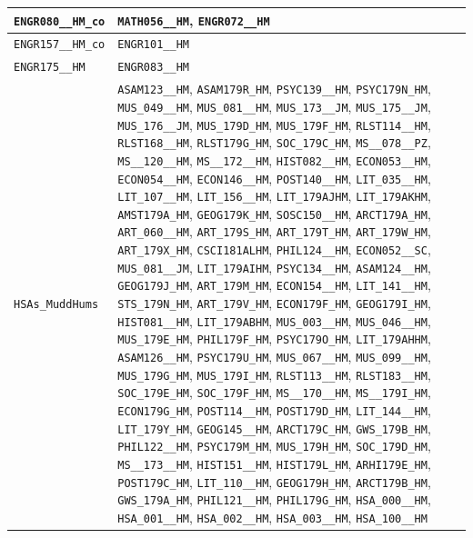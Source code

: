 \begin{longtable}{|p{4.4in}|p{4.4in}|}
    \verb|ENGR080__HM_co| & \verb|MATH056__HM|, \verb|ENGR072__HM|\\\hline
    \verb|ENGR157__HM_co| & \verb|ENGR101__HM|\\\hline
    \verb|ENGR175__HM| & \verb|ENGR083__HM|\\\hline
    \verb|HSAs_MuddHums| & \verb|ASAM123__HM|, \verb|ASAM179R_HM|, \verb|PSYC139__HM|, \verb|PSYC179N_HM|, \verb|MUS_049__HM|, \verb|MUS_081__HM|, \verb|MUS_173__JM|, \verb|MUS_175__JM|, \verb|MUS_176__JM|, \verb|MUS_179D_HM|, \verb|MUS_179F_HM|, \verb|RLST114__HM|, \verb|RLST168__HM|, \verb|RLST179G_HM|, \verb|SOC_179C_HM|, \verb|MS__078__PZ|, \verb|MS__120__HM|, \verb|MS__172__HM|, \verb|HIST082__HM|, \verb|ECON053__HM|, \verb|ECON054__HM|, \verb|ECON146__HM|, \verb|POST140__HM|, \verb|LIT_035__HM|, \verb|LIT_107__HM|, \verb|LIT_156__HM|, \verb|LIT_179AJHM|, \verb|LIT_179AKHM|, \verb|AMST179A_HM|, \verb|GEOG179K_HM|, \verb|SOSC150__HM|, \verb|ARCT179A_HM|, \verb|ART_060__HM|, \verb|ART_179S_HM|, \verb|ART_179T_HM|, \verb|ART_179W_HM|, \verb|ART_179X_HM|, \verb|CSCI181ALHM|, \verb|PHIL124__HM|, \verb|ECON052__SC|, \verb|MUS_081__JM|, \verb|LIT_179AIHM|, \verb|PSYC134__HM|, \verb|ASAM124__HM|, \verb|GEOG179J_HM|, \verb|ART_179M_HM|, \verb|ECON154__HM|, \verb|LIT_141__HM|, \verb|STS_179N_HM|, \verb|ART_179V_HM|, \verb|ECON179F_HM|, \verb|GEOG179I_HM|, \verb|HIST081__HM|, \verb|LIT_179ABHM|, \verb|MUS_003__HM|, \verb|MUS_046__HM|, \verb|MUS_179E_HM|, \verb|PHIL179F_HM|, \verb|PSYC179O_HM|, \verb|LIT_179AHHM|, \verb|ASAM126__HM|, \verb|PSYC179U_HM|, \verb|MUS_067__HM|, \verb|MUS_099__HM|, \verb|MUS_179G_HM|, \verb|MUS_179I_HM|, \verb|RLST113__HM|, \verb|RLST183__HM|, \verb|SOC_179E_HM|, \verb|SOC_179F_HM|, \verb|MS__170__HM|, \verb|MS__179I_HM|, \verb|ECON179G_HM|, \verb|POST114__HM|, \verb|POST179D_HM|, \verb|LIT_144__HM|, \verb|LIT_179Y_HM|, \verb|GEOG145__HM|, \verb|ARCT179C_HM|, \verb|GWS_179B_HM|, \verb|PHIL122__HM|, \verb|PSYC179M_HM|, \verb|MUS_179H_HM|, \verb|SOC_179D_HM|, \verb|MS__173__HM|, \verb|HIST151__HM|, \verb|HIST179L_HM|, \verb|ARHI179E_HM|, \verb|POST179C_HM|, \verb|LIT_110__HM|, \verb|GEOG179H_HM|, \verb|ARCT179B_HM|, \verb|GWS_179A_HM|, \verb|PHIL121__HM|, \verb|PHIL179G_HM|, \verb|HSA_000__HM|, \verb|HSA_001__HM|, \verb|HSA_002__HM|, \verb|HSA_003__HM|, \verb|HSA_100__HM|\\\hline

\end{longtable}
